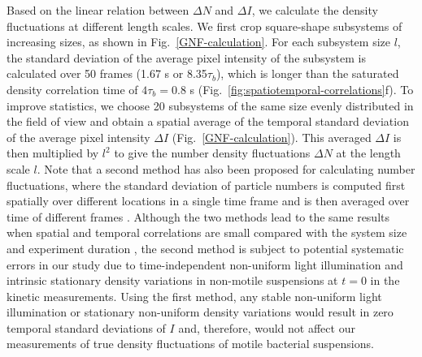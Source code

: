 Based on the linear relation between $\Delta N$ and $\Delta I$, we calculate the density fluctuations at different length scales. We first crop square-shape subsystems of increasing sizes, as shown in Fig.~\ref{GNF-calculation}. For each subsystem size $l$, the standard deviation of the average pixel intensity of the subsystem is calculated over 50 frames (1.67 s or 8.35$\tau_b$), which is longer than the saturated density correlation time of $4\tau_b = 0.8$ s (Fig.~\ref{fig:spatiotemporal-correlations}f). To improve statistics, we choose 20 subsystems of the same size evenly distributed in the field of view and obtain a spatial average of the temporal standard deviation of the average pixel intensity $\Delta I$ (Fig.~\ref{GNF-calculation}). This averaged $\Delta I$ is then multiplied by $l^2$ to give the number density fluctuations $\Delta N$ at the length scale $l$. Note that a second method has also been proposed for calculating number fluctuations, where the standard deviation of particle numbers is computed first spatially over different locations in a single time frame and is then averaged over time of different frames \cite{Aranson2008}.  Although the two methods lead to the same results when spatial and temporal correlations are small compared with the system size and experiment duration \cite{Aranson2008}, the second method is subject to potential systematic errors in our study due to time-independent non-uniform light illumination and intrinsic stationary density variations in non-motile suspensions at $t=0$ in the kinetic measurements. Using the first method, any stable non-uniform light illumination or stationary non-uniform density variations would result in zero temporal standard deviations of $I$ and, therefore, would not affect our measurements of true density fluctuations of motile bacterial suspensions.

